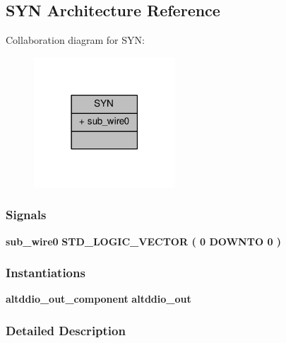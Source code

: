 \subsection{S\+YN Architecture Reference}
\label{classddrox1_1_1SYN}


Collaboration diagram for S\+YN\+:\nopagebreak
\begin{figure}[H]
\begin{center}
\leavevmode
\includegraphics[width=150pt]{da/d62/classddrox1_1_1SYN__coll__graph}
\end{center}
\end{figure}
\subsubsection*{Signals}
 \begin{DoxyCompactItemize}
\item 
{\bf sub\+\_\+wire0} {\bfseries \textcolor{comment}{S\+T\+D\+\_\+\+L\+O\+G\+I\+C\+\_\+\+V\+E\+C\+T\+OR}\textcolor{vhdlchar}{ }\textcolor{vhdlchar}{(}\textcolor{vhdlchar}{ }\textcolor{vhdlchar}{ } \textcolor{vhdldigit}{0} \textcolor{vhdlchar}{ }\textcolor{keywordflow}{D\+O\+W\+N\+TO}\textcolor{vhdlchar}{ }\textcolor{vhdlchar}{ } \textcolor{vhdldigit}{0} \textcolor{vhdlchar}{ }\textcolor{vhdlchar}{)}\textcolor{vhdlchar}{ }} 
\end{DoxyCompactItemize}
\subsubsection*{Instantiations}
 \begin{DoxyCompactItemize}
\item 
{\bf altddio\+\_\+out\+\_\+component}  {\bfseries altddio\+\_\+out}   
\end{DoxyCompactItemize}


\subsubsection{Detailed Description}



